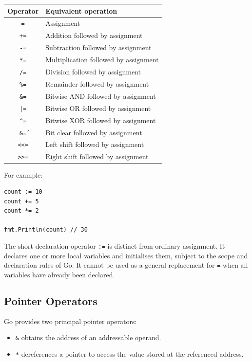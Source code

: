 \begin{center}
\begin{tabular}{|c|l|}
\hline
\textbf{Operator} & \textbf{Equivalent operation} \\
\hline
\texttt{=} & Assignment \\
\texttt{+=} & Addition followed by assignment \\
\texttt{-=} & Subtraction followed by assignment \\
\texttt{*=} & Multiplication followed by assignment \\
\texttt{/=} & Division followed by assignment \\
\texttt{\%=} & Remainder followed by assignment \\
\texttt{\&=} & Bitwise AND followed by assignment \\
\texttt{|=} & Bitwise OR followed by assignment \\
\texttt{\^{ }=} & Bitwise XOR followed by assignment \\
\texttt{\&\^=} & Bit clear followed by assignment \\
\texttt{<<=} & Left shift followed by assignment \\
\texttt{>>=} & Right shift followed by assignment \\
\hline
\end{tabular}
\end{center}

For example:

\begin{lstlisting}
count := 10
count += 5
count *= 2

fmt.Println(count) // 30
\end{lstlisting}

The short declaration operator \texttt{:=} is distinct from
ordinary assignment. It declares one or more local variables
and initialises them, subject to the scope and declaration
rules of Go. It cannot be used as a general replacement for
\texttt{=} when all variables have already been declared.

\subsection{Pointer Operators}

Go provides two principal pointer operators:

\begin{itemize}
    \item \texttt{\&} obtains the address of an addressable
    operand.
    \item \texttt{*} dereferences a pointer to access the
    value stored at the referenced address.
\end{itemize}


